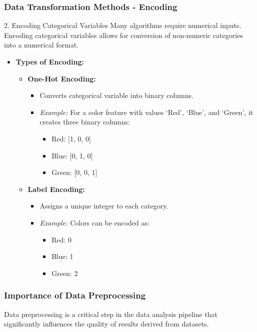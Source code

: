 \documentclass[aspectratio=169]{beamer}
\begin{document}
\begin{frame}[fragile]
    \frametitle{Data Transformation Methods - Encoding}
    \begin{block}{2. Encoding Categorical Variables}
        Many algorithms require numerical inputs. Encoding categorical variables allows for conversion of non-numeric categories into a numerical format.
    \end{block}
    \begin{itemize}
        \item \textbf{Types of Encoding:}
        \begin{itemize}
            \item \textbf{One-Hot Encoding:}
            \begin{itemize}
                \item Converts categorical variable into binary columns.
                \item \textit{Example:} For a color feature with values ‘Red’, ‘Blue’, and ‘Green’, it creates three binary columns:
                \begin{itemize}
                    \item Red: [1, 0, 0]
                    \item Blue: [0, 1, 0]
                    \item Green: [0, 0, 1]
                \end{itemize}
            \end{itemize}
            \item \textbf{Label Encoding:}
            \begin{itemize}
                \item Assigns a unique integer to each category.
                \item \textit{Example:} Colors can be encoded as:
                \begin{itemize}
                    \item Red: 0
                    \item Blue: 1
                    \item Green: 2
                \end{itemize}
            \end{itemize}
        \end{itemize}
    \end{itemize}
\end{frame}

\begin{frame}[fragile]
  \frametitle{Importance of Data Preprocessing}
  Data preprocessing is a critical step in the data analysis pipeline that significantly influences the quality of results derived from datasets.
\end{frame}
\end{document}
